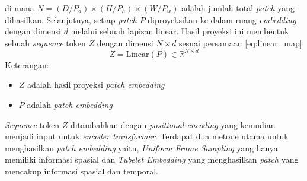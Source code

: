 di mana $N = (D/P_d) \times (H/P_h) \times (W/P_w)$ adalah jumlah total \textit{patch} yang dihasilkan.
Selanjutnya, setiap \textit{patch} $P$ diproyeksikan ke dalam ruang \textit{embedding} dengan dimensi $d$ melalui sebuah lapisan linear. Hasil proyeksi ini membentuk sebuah \textit{sequence} token $Z$ dengan dimensi $N \times d$ sesuai persamaan \ref{eq:linear_map}
\begin{equation}
    Z = \text{Linear}(P) \in \mathbb{R}^{N \times d} \label{eq:linear_map}
\end{equation}
Keterangan:
\begin{itemize}
    \item $Z$ adalah hasil proyeksi \textit{patch embedding}
    \item $P$ adalah \textit{patch embedding}
\end{itemize}

\textit{Sequence} token $Z$ ditambahkan dengan \textit{positional encoding} yang  kemudian menjadi input untuk \textit{encoder transformer}. Terdapat dua metode utama untuk menghasilkan \textit{patch embedding} yaitu, \textit{Uniform Frame Sampling} yang hanya memiliki informasi spasial dan \textit{Tubelet Embedding} yang menghasilkan \textit{patch} yang mencakup informasi spasial dan temporal.